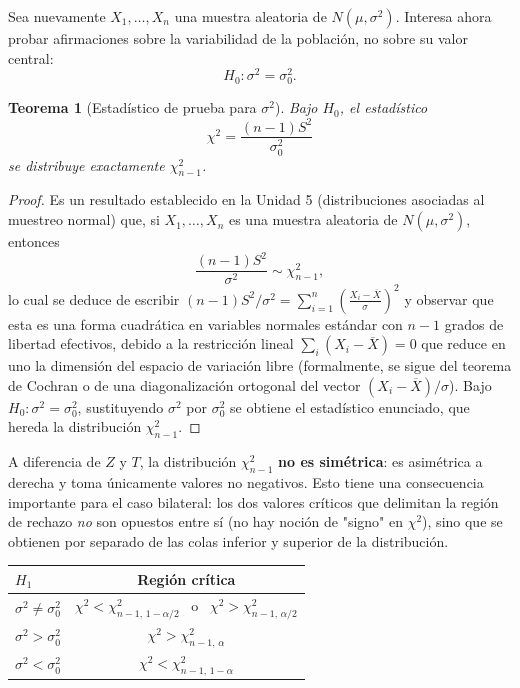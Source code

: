 \documentclass[11pt,a4paper]{article}
\theoremstyle{plain}
\newtheorem{teorema}{Teorema}[section]
\theoremstyle{definition}
\theoremstyle{remark}
\begin{document}
Sea nuevamente $X_1,\dots,X_n$ una muestra aleatoria de $N(\mu,\sigma^2)$. Interesa ahora probar afirmaciones sobre la variabilidad de la población, no sobre su valor central:
\[
H_0:\sigma^2=\sigma_0^2.
\]

\begin{teorema}[Estadístico de prueba para $\sigma^2$]
Bajo $H_0$, el estadístico
\[
\chi^2=\frac{(n-1)S^2}{\sigma_0^2}
\]
se distribuye exactamente $\chi^2_{n-1}$.
\end{teorema}

\begin{proof}
Es un resultado establecido en la Unidad 5 (distribuciones asociadas al muestreo normal) que, si $X_1,\dots,X_n$ es una muestra aleatoria de $N(\mu,\sigma^2)$, entonces
\[
\frac{(n-1)S^2}{\sigma^2}\sim\chi^2_{n-1},
\]
lo cual se deduce de escribir $(n-1)S^2/\sigma^2 = \sum_{i=1}^n\left(\frac{X_i-\overline X}{\sigma}\right)^2$ y observar que esta es una forma cuadrática en variables normales estándar con $n-1$ grados de libertad efectivos, debido a la restricción lineal $\sum_i (X_i-\overline X)=0$ que reduce en uno la dimensión del espacio de variación libre (formalmente, se sigue del teorema de Cochran o de una diagonalización ortogonal del vector $(X_i-\overline X)/\sigma$). Bajo $H_0:\sigma^2=\sigma_0^2$, sustituyendo $\sigma^2$ por $\sigma_0^2$ se obtiene el estadístico enunciado, que hereda la distribución $\chi^2_{n-1}$.
\end{proof}

A diferencia de $Z$ y $T$, la distribución $\chi^2_{n-1}$ \textbf{no es simétrica}: es asimétrica a derecha y toma únicamente valores no negativos. Esto tiene una consecuencia importante para el caso bilateral: los dos valores críticos que delimitan la región de rechazo \emph{no} son opuestos entre sí (no hay noción de "signo" en $\chi^2$), sino que se obtienen por separado de las colas inferior y superior de la distribución.

\begin{table}[h]
\centering
\small
\begin{tabular}{@{}lc@{}}
\toprule
$H_1$ & Región crítica \\
\midrule
$\sigma^2\neq\sigma_0^2$ & $\chi^2<\chi^2_{n-1,\,1-\alpha/2}$ \ o \ $\chi^2>\chi^2_{n-1,\,\alpha/2}$ \\
$\sigma^2>\sigma_0^2$ & $\chi^2>\chi^2_{n-1,\,\alpha}$ \\
$\sigma^2<\sigma_0^2$ & $\chi^2<\chi^2_{n-1,\,1-\alpha}$ \\
\bottomrule
\end{tabular}
\end{table}
\end{document}

